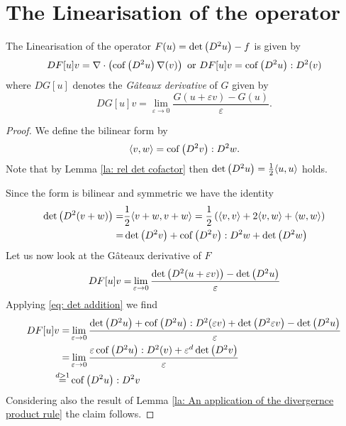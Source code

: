 \section{The Linearisation of the \MA operator}

	\begin{theorem}[Linearisation] \label{thm: linearisation}
		The Linearisation of the \MA operator $F(u)=\det{\left(D^2u\right)}-f$ is given by
		\begin{align}
			DF[u]v = \nabla \cdot \left( \operatorname{cof} \left( D^2 u  \right) \nabla (v) \right) \text{ or } DF[u]v=\operatorname{cof} \left( D^2 u \right):D^2 (v)		\end{align}
	where $DG[u]$ denotes the \emph{G\^ateaux derivative} of $G$ given by
	\[
		DG[u]v = \lim\limits_{\varepsilon \rightarrow 0} \frac { G(u+\varepsilon v) - G(u)}\varepsilon.
	\]
	\end{theorem}
		
	\begin{proof}
	We define the \MA bilinear form by
	\[
	 \langle v, w \rangle = \operatorname{cof} \left( D^2 v \right):D^2w.
	\]
	Note that by Lemma \ref{la: rel det cofactor} then $\det{\left(D^2 u\right)} = \frac 1 2  \langle u, u \rangle$ holds.
	
	Since the \MA form is bilinear and symmetric we have the identity
	\begin{align}
		\det{\left(D^2 (v+w)\right)} =& \frac 1 2  \langle v+w, v+w \rangle = \frac 1 2 \left( \langle v, v \rangle + 2  \langle v, w \rangle +  \langle w, w \rangle \right)  \\
		=&  \det{\left(D^2 v\right)}  + \operatorname{cof} \left( D^2 v \right) : D^2 w + \det{\left(D^2 w\right)} \label{eq: det addition}
	\end{align}
	 Let us now look at the G\^ateaux derivative of $F$
		\begin{align*}
			DF[u]v =& \lim\limits_{\varepsilon \rightarrow 0} \frac { \det{\left(D^2(u+\varepsilon v)\right)} - \det{\left(D^2u\right)}}\varepsilon\\
			\end{align*}
Applying \eqref{eq: det addition} we find
		\begin{align*}
			DF[u]v =& \lim\limits_{\varepsilon \rightarrow 0} 
										\frac  {\det{\left(D^2 u\right)} + \operatorname{cof} \left( D^2 u \right) : D^2(\varepsilon v) + \det{\left(D^2 \varepsilon v\right)} - \det{\left(D^2 u\right)}}
													\varepsilon\\ 
			 =& \lim\limits_{\varepsilon \rightarrow 0} 
										\frac  {\varepsilon \operatorname{cof} \left( D^2 u \right) : D^2(v) + \varepsilon^d \det{\left(D^2 v\right)}}
													\varepsilon\\ 
			\stackrel{d > 1} =& \operatorname{cof} \left( D^2 u \right):D^2v
		\end{align*}
Considering also the result of Lemma \ref{la: An application of the divergernce product rule} the claim follows.
	\end{proof}	


